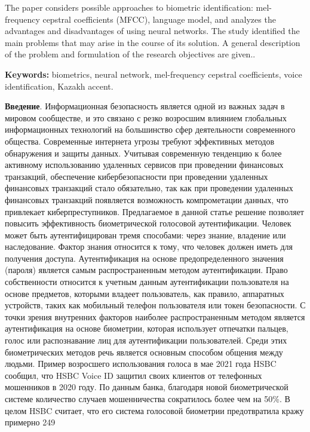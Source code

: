 The paper considers possible approaches to biometric identification:
mel-frequency cepstral coefficients (MFCC), language model, and analyzes
the advantages and disadvantages of using neural networks. The study
identified the main problems that may arise in the course of its
solution. A general description of the problem and formulation of the
research objectives are given..

{\bfseries Keywords:} biometrics, neural network, mel-frequency cepstral
coefficients, voice identification, Kazakh accent.

\begin{multicols}{2}
{\bfseries Введение}. Информационная безопасность является одной из важных
задач в мировом сообществе, и это связано с резко возросшим влиянием
глобальных информационных технологий на большинство сфер деятельности
современного общества. Современные интернета угрозы требуют эффективных
методов обнаружения и защиты данных. Учитывая современную тенденцию к
более активному использованию удаленных сервисов при проведении
финансовых транзакций, обеспечение кибербезопасности при проведении
удаленных финансовых транзакций стало обязательно, так как при
проведении удаленных финансовых транзакций появляется возможность
компрометации данных, что привлекает киберпреступников. Предлагаемое в
данной статье решение позволяет повысить эффективность биометрической
голосовой аутентификации. Человек может быть аутентифицирован тремя
способами: через знание, владение или наследование. Фактор знания
относится к тому, что человек должен иметь для получения доступа.
Аутентификация на основе предопределенного значения (пароля) является
самым распространенным методом аутентификации. Право собственности
относится к учетным данным аутентификации пользователя на основе
предметов, которыми владеет пользователь, как правило, аппаратных
устройств, таких как мобильный телефон пользователя или токен
безопасности. С точки зрения внутренних факторов наиболее
распространенным методом является аутентификация на основе биометрии,
которая использует отпечатки пальцев, голос или распознавание лиц для
аутентификации пользователей. Среди этих биометрических методов речь
является основным способом общения между людьми. Пример возросшего
использования голоса в мае 2021 года HSBC сообщил, что HSBC Voice ID
защитил своих клиентов от телефонных мошенников в 2020 году. По данным
банка, благодаря новой биометрической системе количество случаев
мошенничества сократилось более чем на 50\%. В целом HSBC считает, что
его система голосовой биометрии предотвратила кражу примерно 249

\end{multicols}
